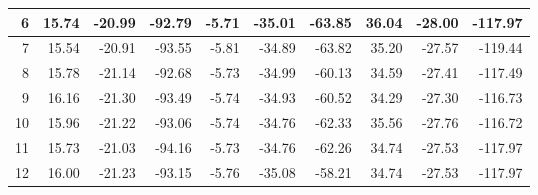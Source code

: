 \begin{table}[]
{\begin{tabular}{|r|r|r|r|r|r|r|r|r|r|}
6                             & 15.74                       & -20.99                      & -92.79                                 & -5.71                       & -35.01                      & -63.85                                 & 36.04                       & -28.00                         & -117.97                                \\ \hline
7                             & 15.54                       & -20.91                      & -93.55                                 & -5.81                       & -34.89                      & -63.82                                 & 35.20                        & -27.57                      & -119.44                                \\ \hline
8                             & 15.78                       & -21.14                      & -92.68                                 & -5.73                       & -34.99                      & -60.13                                 & 34.59                       & -27.41                      & -117.49                                \\ \hline
9                             & 16.16                       & -21.30                       & -93.49                                 & -5.74                       & -34.93                      & -60.52                                 & 34.29                       & -27.30                       & -116.73                                \\ \hline
10                            & 15.96                       & -21.22                      & -93.06                                 & -5.74                       & -34.76                      & -62.33                                 & 35.56                       & -27.76                      & -116.72                                \\ \hline
11                            & 15.73                       & -21.03                      & -94.16                                 & -5.73                       & -34.76                      & -62.26                                 & 34.74                       & -27.53                      & -117.97                                \\ \hline
12                            & 16.00                          & -21.23                      & -93.15                                 & -5.76                       & -35.08                      & -58.21                                 & 34.74                       & -27.53                      & -117.97                                \\ \hline

\end{tabular}}
\end{table}
